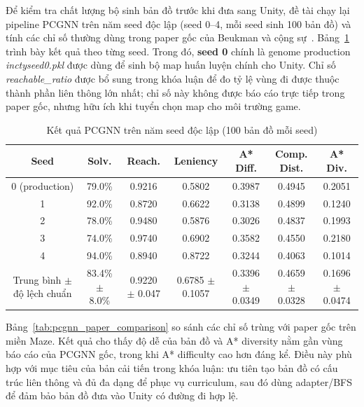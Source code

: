 Để kiểm tra chất lượng bộ sinh bản đồ trước khi đưa sang Unity, đề tài chạy lại pipeline PCGNN trên năm seed độc lập (seed 0--4, mỗi seed sinh 100 bản đồ) và tính các chỉ số thường dùng trong paper gốc của Beukman và cộng sự~\cite{Beukman2022}. Bảng~\ref{tab:pcgnn_four_seed_metrics} trình bày kết quả theo từng seed. Trong đó, \textbf{seed 0} chính là genome production \emph{inctyseed0.pkl} được dùng để sinh bộ map huấn luyện chính cho Unity. Chỉ số \emph{reachable\_ratio} được bổ sung trong khóa luận để đo tỷ lệ vùng đi được thuộc thành phần liên thông lớn nhất; chỉ số này không được báo cáo trực tiếp trong paper gốc, nhưng hữu ích khi tuyển chọn map cho môi trường game.

\begin{table}[H]
    \centering
    \scriptsize
    \setlength{\tabcolsep}{4pt}
    \renewcommand{\arraystretch}{1.15}
    \caption{Kết quả PCGNN trên năm seed độc lập (100 bản đồ mỗi seed)}
    \label{tab:pcgnn_four_seed_metrics}
    \begin{tabular}{c c c c c c c}
        \toprule
        \textbf{Seed} & \textbf{Solv.} & \textbf{Reach.} & \textbf{Leniency} & \textbf{A* Diff.} & \textbf{Comp. Dist.} & \textbf{A* Div.} \\
        \midrule
        0 (production) & 79.0\% & 0.9216 & 0.5802 & 0.3987 & 0.4945 & 0.2051 \\
        1 & 92.0\% & 0.8720 & 0.6622 & 0.3138 & 0.4899 & 0.1240 \\
        2 & 78.0\% & 0.9480 & 0.5876 & 0.3026 & 0.4837 & 0.1993 \\
        3 & 74.0\% & 0.9740 & 0.6902 & 0.3582 & 0.4550 & 0.2180 \\
        4 & 94.0\% & 0.8940 & 0.8722 & 0.3244 & 0.4063 & 0.1014 \\
        \midrule
        Trung bình $\pm$ độ lệch chuẩn & 83.4\% $\pm$ 8.0\% & 0.9220 $\pm$ 0.047 & 0.6785 $\pm$ 0.1057 & 0.3396 $\pm$ 0.0349 & 0.4659 $\pm$ 0.0328 & 0.1696 $\pm$ 0.0474 \\
        \bottomrule
    \end{tabular}
\end{table}

Bảng~\ref{tab:pcgnn_paper_comparison} so sánh các chỉ số trùng với paper gốc trên miền Maze. Kết quả cho thấy độ dễ của bản đồ và A* diversity nằm gần vùng báo cáo của PCGNN gốc, trong khi A* difficulty cao hơn đáng kể. Điều này phù hợp với mục tiêu của bản cải tiến trong khóa luận: ưu tiên tạo bản đồ có cấu trúc liên thông và đủ đa dạng để phục vụ curriculum, sau đó dùng adapter/BFS để đảm bảo bản đồ đưa vào Unity có đường đi hợp lệ.

